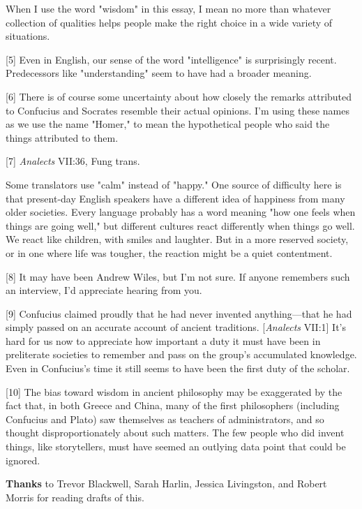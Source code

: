 When
                  I use the word "wisdom" in this essay, I mean no more than
                  whatever collection of qualities helps people make the right
                  choice in a wide variety of situations.

[5] Even in English, our sense of the word "intelligence" is
                  surprisingly recent. Predecessors like "understanding" seem to
                  have had a broader meaning.

[6] There is of course some uncertainty about how closely the
                  remarks attributed to Confucius and Socrates resemble their
                  actual opinions. I'm using these names as we use the name
                  "Homer," to mean the hypothetical people who said the things
                  attributed to them.

[7] \emph{Analects} VII:36, Fung trans.

Some
                  translators use "calm" instead of "happy." One source of
                  difficulty here is that present-day English speakers have a
                  different idea of happiness from many older societies. Every
                  language probably has a word meaning "how one feels when
                  things are going well," but different cultures react
                  differently when things go well. We react like children, with
                  smiles and laughter. But in a more reserved society, or in one
                  where life was tougher, the reaction might be a quiet
                  contentment.

[8] It may have been Andrew Wiles, but I'm not sure. If anyone
                  remembers such an interview, I'd appreciate hearing from
                  you.

[9] Confucius claimed proudly that he had never invented
                  anything---that he had simply passed on an accurate
                  account of ancient traditions. [\emph{Analects} VII:1] It's
                  hard for us now to appreciate how important a duty it must
                  have been in preliterate societies to remember and pass on the
                  group's accumulated knowledge. Even in Confucius's time it
                  still seems to have been the first duty of the scholar.

[10] The bias toward wisdom in ancient philosophy may be
                  exaggerated by the fact that, in both Greece and China, many
                  of the first philosophers (including Confucius and Plato) saw
                  themselves as teachers of administrators, and so thought
                  disproportionately about such matters. The few people who did
                  invent things, like storytellers, must have seemed an outlying
                  data point that could be ignored.

\textbf{Thanks} to
                  Trevor Blackwell, Sarah Harlin, Jessica Livingston, and Robert
                  Morris for reading drafts of this.


              
            
          
